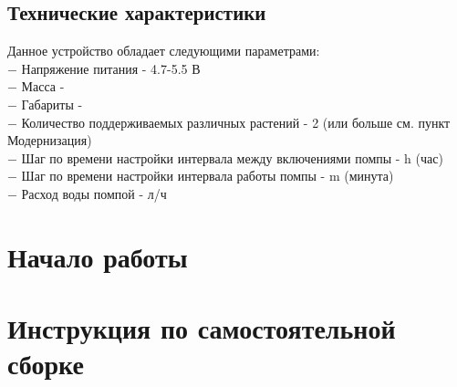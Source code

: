 \documentclass[12pt]{article}
\begin{document}
	\subsection{Технические характеристики}
	Данное устройство обладает следующими параметрами: \\
	
	$-$ Напряжение питания - 4.7-5.5 В \\

	$-$ Масса - \\
	
	$-$ Габариты - \\
	
	$-$ Количество поддерживаемых различных растений - 2 (или больше см. пункт Модернизация) \\
	
	$-$ Шаг по времени настройки интервала между включениями помпы - h (час) \\
	
	$-$ Шаг по времени настройки интервала работы помпы - m (минута)\\
	
	$-$ Расход воды помпой -  л/ч \\
	
	
	
	
	\section{Начало работы}
	
	
	\section{Инструкция по самостоятельной сборке}
	
\end{document}
